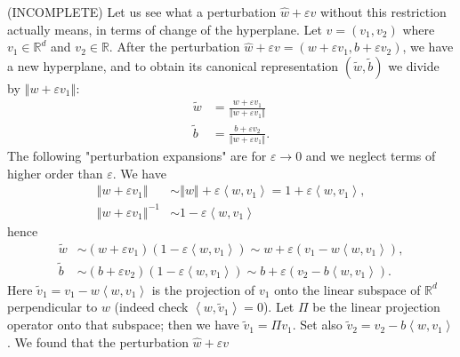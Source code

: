 \documentclass[11pt,twoside]{article}%
\theoremstyle{change}
\newenvironment{quote-env}{\begin{quote}\sffamily }{\end{quote}}
\newenvironment{mycomments-env}[1][Mycomments]{\textbf{#1.} \begin{quote-env} }{ \end{quote-env}  \ \rule{0.5em}{0.5em}}
\begin{document}
\begin{mycomments}%


\begin{mycomments-env}
(INCOMPLETE) Let us see what a perturbation $\hat{w}+\varepsilon v$ without
this restriction actually means, in terms of change of the hyperplane. Let
$v=\left(  v_{1},v_{2}\right)  $ where $v_{1}\in\mathbb{R}^{d}$ and $v_{2}%
\in\mathbb{R}$. After the perturbation $\hat{w}+\varepsilon v=\left(
w+\varepsilon v_{1},b+\varepsilon v_{2}\right)  $, we have a new hyperplane,
and to obtain its canonical representation $(\tilde{w},\tilde{b})$ we divide
by $\left\Vert w+\varepsilon v_{1}\right\Vert $:
\begin{align*}
\tilde{w}  & =\frac{w+\varepsilon v_{1}}{\left\Vert w+\varepsilon
v_{1}\right\Vert }\\
\tilde{b}  & =\frac{b+\varepsilon v_{2}}{\left\Vert w+\varepsilon
v_{1}\right\Vert }.
\end{align*}
The following "perturbation expansions" are for $\varepsilon\rightarrow0$ and
we neglect terms of higher order than $\varepsilon$. We have
\begin{align*}
\left\Vert w+\varepsilon v_{1}\right\Vert  & \sim\left\Vert w\right\Vert
+\varepsilon\left\langle w,v_{1}\right\rangle =1+\varepsilon\left\langle
w,v_{1}\right\rangle ,\\
\left\Vert w+\varepsilon v_{1}\right\Vert ^{-1}  & \sim1-\varepsilon
\left\langle w,v_{1}\right\rangle
\end{align*}
hence
\begin{align*}
\tilde{w}  & \sim\left(  w+\varepsilon v_{1}\right)  \left(  1-\varepsilon
\left\langle w,v_{1}\right\rangle \right)  \sim w+\varepsilon\left(
v_{1}-w\left\langle w,v_{1}\right\rangle \right)  ,\\
\tilde{b}  & \sim\left(  b+\varepsilon v_{2}\right)  \left(  1-\varepsilon
\left\langle w,v_{1}\right\rangle \right)  \sim b+\varepsilon\left(
v_{2}-b\left\langle w,v_{1}\right\rangle \right)  .
\end{align*}
Here $\tilde{v}_{1}=v_{1}-w\left\langle w,v_{1}\right\rangle $ is the
projection of $v_{1}$ onto the linear subspace of $\mathbb{R}^{d}$
perpendicular to $w$ (indeed check $\left\langle w,\tilde{v}_{1}\right\rangle
=0$). Let $\Pi$ be the linear projection operator onto that subspace; then we
have $\tilde{v}_{1}=\Pi v_{1}$. Set also $\tilde{v}_{2}=v_{2}-b\left\langle
w,v_{1}\right\rangle $. We found that the perturbation $\hat{w}+\varepsilon v$

\end{mycomments-env}
\end{mycomments}
\end{document}
